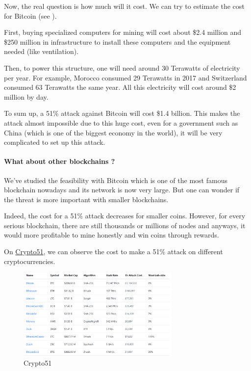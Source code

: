 Now, the real question is how much will it cost. We can try to estimate the cost for Bitcoin (see \cite{cost_bitcoin_51_attack}). \newline

First, buying specialized computers for mining will cost about \$2.4 million and \$250 million in infrastructure to install these computers and the equipment needed (like ventilation). \newline

Then, to power this structure, one will need around 30 Terawatts of electricity per year. For example, Morocco consumed 29 Terawatts in 2017 and Switzerland consumed 63 Terawatts the same year. All this electricity will cost around \$2 million by day. \newline

To sum up, a 51\% attack against Bitcoin will cost \$1.4 billion. This makes the attack almost impossible due to this huge cost, even for a government such as China (which is one of the biggest economy in the world), it will be very complicated to set up this attack.

    \paragraph{What about other blockchains ?}


We've studied the feasibility with Bitcoin which is one of the most famous blockchain nowadays and its network is now very large. But one can wonder if the threat is more important with smaller blockchains. \newline

Indeed, the cost for a 51\% attack decreases for smaller coins. However, for every serious blockchain, there are still thousands or millions of nodes and anyways, it would more profitable to mine honestly and win coins through rewards.

On \href{https://www.crypto51.app/}{Crypto51}, we can observe the cost to make a 51\% attack on different cryptocurrencies. \newline

\begin{figure}[h]
\centering
\includegraphics[width=8cm]{Figures/crypto51}
\caption{Crypto51}
\end{figure}
\medskip


